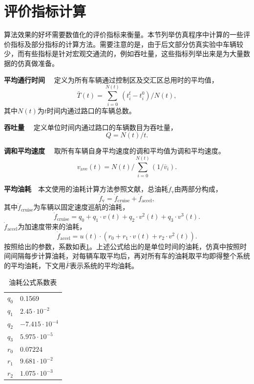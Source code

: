 \section{评价指标计算}
算法效果的好坏需要数值化的评价指标来衡量。本节列举仿真程序中计算的一些评价指标及部分指标的计算方法。需要注意的是，由于后文部分仿真实验中车辆较少，而有些指标是针对宏观交通流的，例如吞吐量，这些指标列举出来是为大量数据的仿真做准备。

\textbf{平均通行时间} \ \
定义为所有车辆通过控制区及交汇区总用时的平均值，
\begin{equation}
\bar{T}(t) = \sum_{i=0}^{N(t)}(t_i^\mathrm{f}-t_i^0)/N(t),
\end{equation}
其中$N(t)$为$t$时间内通过路口的车辆总数。

\textbf{吞吐量} \ \
定义单位时间内通过路口的车辆数目为吞吐量，
\begin{equation}
Q=N(t)/t.
\end{equation}

\textbf{调和平均速度} \ \
取所有车辆自身平均速度的调和平均值为调和平均速度。
\begin{equation}
v_\mathrm{ave}(t)=N(t)/\sum_{i=0}^{N(t)}(1/\bar{v}_{i}).
\end{equation}

\textbf{平均油耗}\ \ 本文使用的油耗计算方法参照文献，总油耗$\dot{f}_\mathrm{v}$由两部分构成， \ \
\begin{equation}
\dot{f}_\mathrm{v} = \dot{f}_\mathrm{cruise} + \dot{f}_\mathrm{accel},
\end{equation}
其中$\dot{f}_\mathrm{cruise}$为车辆以固定速度巡航的油耗，
\begin{equation}
\dot{f}_\mathrm{cruise}=q_0+q_1\cdot v(t)+q_2\cdot v^2(t) + q_3\cdot v^3(t).
\end{equation}
$\dot{f}_\mathrm{accel}$为加速度带来的油耗，
\begin{equation}
\dot{f}_\mathrm{accel}=u(t) \cdot (r_0 + r_1 \cdot v(t) + r_2 · v^2(t) ).
\end{equation}
按照\inlinecite{Kamal2013Model}给出的参数，系数如表\ref{tab:fuel:param}。上述公式给出的是单位时间的油耗，仿真中按照时间间隔每步计算油耗，对每辆车取平均后，再对所有车的油耗取平均即得整个系统的平均油耗，下文用$\bar{F}$表示系统的平均油耗。
\begin{table}[htbp]
\centering
\caption{油耗公式系数表}
\label{tab:fuel:param}
\begin{tabular}{ll}
\toprule[1.5pt]
$q_0$ & 0.1569 \\
$q_1$ & $2.45 \cdot 10^{−2}$ \\
$q_2$ & $−7.415 \cdot 10^{−4}$ \\
$q_3$ & $5.975 \cdot 10^{-5}$ \\
$r_0$ & $0.07224$ \\
$r_1$ & $9.681 \cdot 10^{−2}$ \\
$r_2$ & $1.075 \cdot 10^{−3}$ \\
\bottomrule[1.5pt]
\end{tabular}
\end{table}

